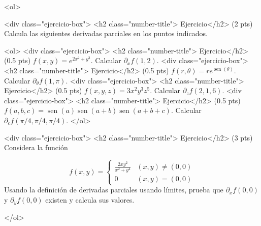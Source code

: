 \documentclass[12pt]{article}
\newcommand{\sen}{\operatorname{sen}}
\begin{document}
\bigskip

            
\bigskip
\bigskip
\bigskip


<ol>

<div class="ejercicio-box"> <h2 class="number-title"> Ejercicio</h2> (2 pts) Calcula las siguientes derivadas parciales
  en los puntos indicados.

  <ol>
  <div class="ejercicio-box"> <h2 class="number-title"> Ejercicio</h2>(0.5 pts) $f(x,y)=e^{2x^2+y^3}$. Calcular $\partial_xf(1,2)$.
  <div class="ejercicio-box"> <h2 class="number-title"> Ejercicio</h2> (0.5 pts) $f(r,\theta)=re^{\sen(\theta)}$.
      Calcular $\partial_\theta f(1,\pi)$.
    <div class="ejercicio-box"> <h2 class="number-title"> Ejercicio</h2> (0.5 pts) $f(x,y,z)=3x^{2}y^{3}z^{5}$. Calcular $\partial_zf(2,1,6)$.
    <div class="ejercicio-box"> <h2 class="number-title"> Ejercicio</h2> (0.5 pts) $f(a,b,c)=\sen(a)\sen(a+b)\sen(a+b+c)$.
      Calcular $\partial_cf(\pi/4,\pi/4, \pi/4)$.
    </ol>
    
    
  
\vspace{4cm}  
  
<div class="ejercicio-box"> <h2 class="number-title"> Ejercicio</h2> (3 pts) Considera la función

  \begin{equation*}
    f(x,y)=\left\{
      \begin{array}{cc}
        \frac{2xy^2}{x^2+y^4} & (x,y)\ne(0,0)\\
        0 & (x,y)=(0,0)
      \end{array}
    \right.
    \end{equation*}
    Usando la definición de derivadas parciales usando límites,
    prueba que $\partial_xf(0,0)$ y $\partial_yf(0,0)$ existen
    y calcula sus valores.



  </ol>


  
\end{document}
